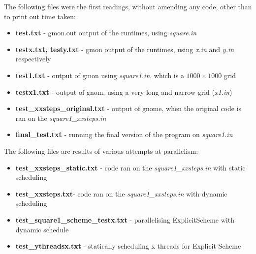 \documentclass[11pt,journal]{IEEEtran}
\begin{document}
	The following files were the first readings, without amending any code, other than to print out time taken:
	
	\begin{itemize}
		\item \textbf{test.txt} - gmon.out output of the runtimes, using \emph{square.in}
		\item \textbf{testx.txt, testy.txt} - gmon output of the runtimes, using \emph{x.in} and \emph{y.in} respectively
		\item \textbf{test1.txt} - output of gmon using \emph{square1.in}, which is a $1000 \times 1000$ grid
		\item \textbf{testx1.txt} - output of gnom, using a very long and narrow grid (\emph{x1.in})
		\item \textbf{test\_xxsteps\_original.txt} - output of gnome, when the original code is ran on the \emph{square1\_xxsteps.in}
		\item \textbf{final\_test.txt} - running the final version of the program on \emph{square1.in}
		
	
	\end{itemize}

	The following files are results of various attempts at parallelism:
	\begin{itemize}
		\item \textbf{test\_xxsteps\_static.txt} - code ran on the \emph{square1\_xxsteps.in} with static scheduling
		\item \textbf{test\_xxsteps.txt}- code ran on the \emph{square1\_xxsteps.in} with dynamic scheduling
		\item \textbf{test\_square1\_scheme\_testx.txt} - parallelising ExplicitScheme with dynamic schedule
		\item \textbf{test\_ythreadsx.txt} - statically scheduling x threads for Explicit Scheme
		
	\end{itemize}
\end{document}
